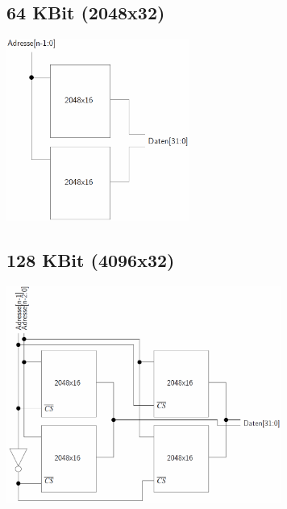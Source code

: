 \begin{multicols}{2}
		\subsection{64 KBit (2048x32)}
			\begin{center}
			\includegraphics[width = 6cm]{images/mem/mem2-2.png}
			\end{center}
		
		\subsection{128 KBit (4096x32)}
			\begin{center}
			\includegraphics[width = 9cm]{images/mem/mem2-3.png}
			\end{center}
		

	\end{multicols}

	
